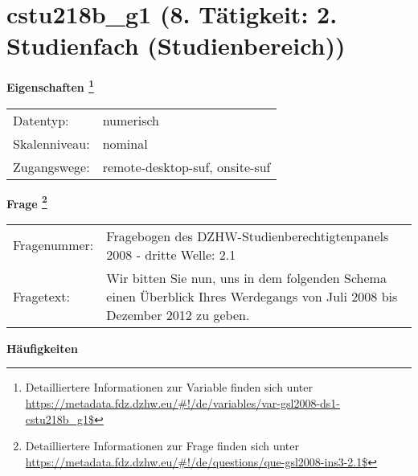
    \setcounter{footnote}{0}

    \vspace*{-1.8cm}
	\section{cstu218b\_g1 (8. Tätigkeit: 2. Studienfach (Studienbereich))}
	\label{section:cstu218b_g1}



    \vspace*{0.5cm}
    \noindent\textbf{Eigenschaften
	\footnote{Detailliertere Informationen zur Variable finden sich unter
		\url{https://metadata.fdz.dzhw.eu/\#!/de/variables/var-gsl2008-ds1-cstu218b_g1$}}}\\
	\begin{tabularx}{\hsize}{@{}lX}
	Datentyp: & numerisch \\
	Skalenniveau: & nominal \\
	Zugangswege: &
	  remote-desktop-suf, 
	  onsite-suf
 \\
    \end{tabularx}



				\vspace*{0.5cm}
                \noindent\textbf{Frage
	                \footnote{Detailliertere Informationen zur Frage finden sich unter
		              \url{https://metadata.fdz.dzhw.eu/\#!/de/questions/que-gsl2008-ins3-2.1$}}}\\
				\begin{tabularx}{\hsize}{@{}lX}
					Fragenummer: &
					  Fragebogen des DZHW-Studienberechtigtenpanels 2008 - dritte Welle:
					  2.1
 \\
					Fragetext: & Wir bitten Sie nun, uns in dem folgenden Schema einen Überblick Ihres Werdegangs von Juli 2008 bis Dezember 2012 zu geben. \\
				\end{tabularx}





        		\vspace*{0.5cm}
                \noindent\textbf{Häufigkeiten}

